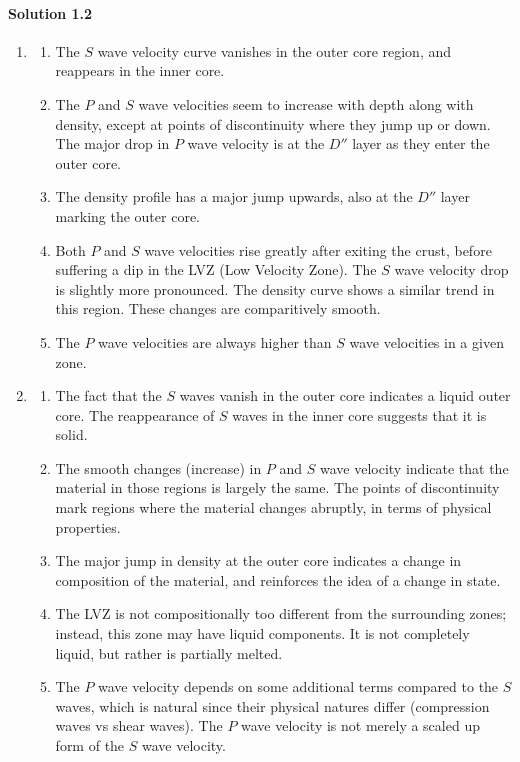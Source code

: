 \documentclass[10pt]{article}
\begin{document}
    \paragraph{Solution 1.2}
    \begin{enumerate}
        \item \begin{enumerate}
            \item The $S$ wave velocity curve vanishes in the outer core region, and
            reappears in the inner core.
            \item The $P$ and $S$ wave velocities seem to increase with depth along 
            with density, except at points of discontinuity where they jump up or
            down.
            The major drop in $P$ wave velocity is at the $D''$ layer as they enter
            the outer core.
            \item The density profile has a major jump upwards, also at the $D''$
            layer marking the outer core.
            \item Both $P$ and $S$ wave velocities rise greatly after exiting the
            crust, before suffering a dip in the LVZ (Low Velocity Zone).
            The $S$ wave velocity drop is slightly more pronounced.
            The density curve shows a similar trend in this region.
            These changes are comparitively smooth.
            \item The $P$ wave velocities are always higher than $S$ wave velocities
            in a given zone.
        \end{enumerate}

        \item \begin{enumerate}
            \item The fact that the $S$ waves vanish in the outer core indicates 
            a liquid outer core. 
            The reappearance of $S$ waves in the inner core suggests that it is
            solid.
            \item The smooth changes (increase) in $P$ and $S$ wave velocity
            indicate that the material in those regions is largely the same.
            The points of discontinuity mark regions where the material changes
            abruptly, in terms of physical properties.
            \item The major jump in density at the outer core indicates a change in
            composition of the material, and reinforces the idea of a change in
            state.
            \item The LVZ is not compositionally too different from the surrounding
            zones; instead, this zone may have liquid components.  It is not
            completely liquid, but rather is partially melted.
            \item The $P$ wave velocity depends on some additional terms compared to
            the $S$ waves, which is natural since their physical natures differ
            (compression waves vs shear waves). The $P$ wave velocity is not merely
            a scaled up form of the $S$ wave velocity.
        \end{enumerate}


\end{enumerate}
\end{document}
